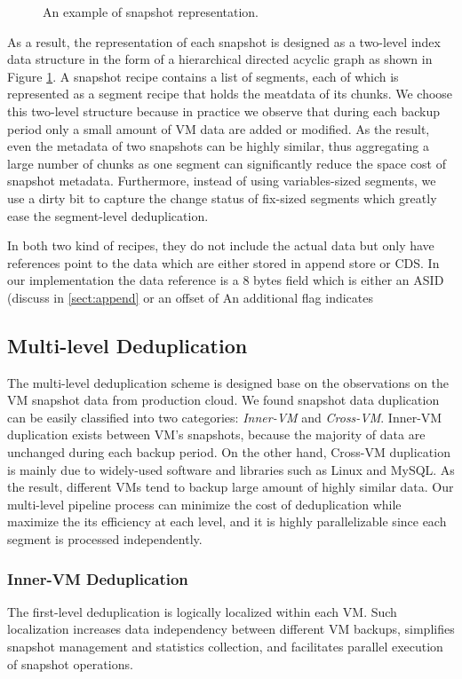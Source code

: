 \begin{figure}[htbp]
  \centering
  \caption{An example of snapshot representation.}
  \label{fig:snapshot}
\end{figure}
As a result, the representation of each snapshot is designed as a two-level index data structure 
in the form of a hierarchical directed acyclic graph as shown in Figure \ref{fig:snapshot}.
A snapshot recipe contains a list of segments, each of which is represented as a segment recipe
that holds the meatdata of its chunks. We choose this two-level structure because in practice we
observe that during each backup period only a small amount of VM data are added or modified. 
As the result, even the metadata of two snapshots can be highly similar, 
thus aggregating a large number of chunks as one segment can significantly reduce the space cost of snapshot metadata.
Furthermore, instead of using variables-sized segments, we use a dirty bit to capture the change status of fix-sized
segments which greatly ease the segment-level deduplication.

In both two kind of recipes, 
they do not include the actual data but only have
 references point to the data which are either stored in append store or CDS.
In our implementation the data reference is a 8 bytes field which is either an 
ASID (discuss in \ref{sect:append} or an offset of 
An additional flag indicates

\subsection{Multi-level Deduplication}
The multi-level deduplication scheme is designed base on the observations on the VM snapshot data from production cloud.
We found snapshot data duplication can be easily classified into two categories: \textit{Inner-VM} and \textit{Cross-VM}. 
Inner-VM duplication exists between VM's snapshots, because the majority of data are unchanged during each backup period. 
On the other hand, Cross-VM duplication is mainly due to widely-used software and libraries such as Linux and MySQL. 
As the result, different VMs tend to backup large amount of highly similar data.
Our multi-level pipeline process can minimize the cost of deduplication while maximize the its efficiency at each level,
and it is highly parallelizable since each segment is processed independently.

\subsubsection{Inner-VM Deduplication}
\label{sect:InnerVM}
The first-level deduplication is logically localized within each VM.
Such localization increases data independency between different VM backups,
simplifies snapshot management and statistics collection,
and facilitates parallel execution of snapshot operations.

